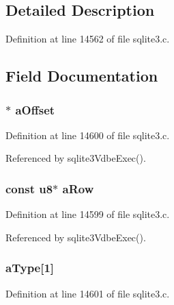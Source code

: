 \subsection{Detailed Description}


Definition at line 14562 of file sqlite3.\+c.



\subsection{Field Documentation}
\hypertarget{struct_vdbe_cursor_a413b8730948be78e2f36c35f6ae453e1}{}
\subsubsection[{a\+Offset}]{$\ast$ a\+Offset}\label{struct_vdbe_cursor_a413b8730948be78e2f36c35f6ae453e1}


Definition at line 14600 of file sqlite3.\+c.



Referenced by sqlite3\+Vdbe\+Exec().

\hypertarget{struct_vdbe_cursor_a2fb89d269dbeccde95fe67e8043782ba}{}
\subsubsection[{a\+Row}]{\setlength{\rightskip}{0pt plus 5cm}const {\bf u8}$\ast$ a\+Row}\label{struct_vdbe_cursor_a2fb89d269dbeccde95fe67e8043782ba}


Definition at line 14599 of file sqlite3.\+c.



Referenced by sqlite3\+Vdbe\+Exec().

\hypertarget{struct_vdbe_cursor_ac9a3d92f6e20d945ec2b55b1402455ba}{}
\subsubsection[{a\+Type}]{ a\+Type\mbox{[}1\mbox{]}}\label{struct_vdbe_cursor_ac9a3d92f6e20d945ec2b55b1402455ba}


Definition at line 14601 of file sqlite3.\+c.



